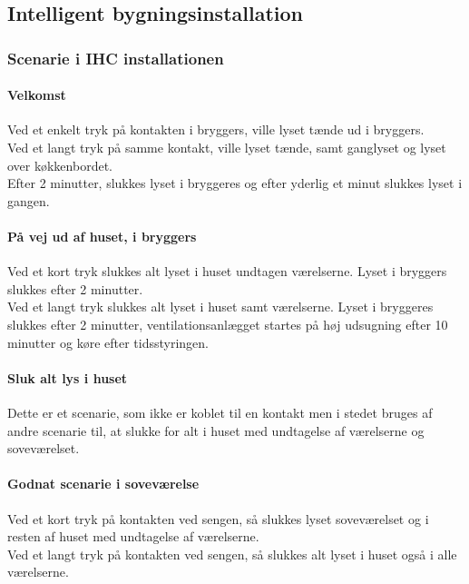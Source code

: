 \subsection{Intelligent bygningsinstallation}

\subsubsection{Scenarie i IHC installationen} \label{subsub:ihc_scener}

\paragraph{Velkomst}
Ved et enkelt tryk på kontakten i bryggers, ville lyset tænde ud i bryggers.\\
Ved et langt tryk på samme kontakt, ville lyset tænde, 
samt ganglyset og lyset over køkkenbordet.\\
Efter 2 minutter, slukkes lyset i bryggeres og efter yderlig et minut slukkes lyset i gangen.

\paragraph{På vej ud af huset, i bryggers}
Ved et kort tryk slukkes alt lyset i huset undtagen værelserne. 
Lyset i bryggers slukkes efter 2 minutter. \\
Ved et langt tryk slukkes alt lyset i huset samt værelserne. 
Lyset i bryggeres slukkes efter 2 minutter, 
ventilationsanlægget startes på høj udsugning efter 10 minutter og køre efter tidsstyringen. 

\paragraph{Sluk alt lys i huset}
Dette er et scenarie, som ikke er koblet til en kontakt men i stedet bruges af andre scenarie til, 
at slukke for alt i huset med undtagelse af værelserne og soveværelset.

\paragraph{Godnat scenarie i soveværelse}
Ved et kort tryk på kontakten ved sengen, 
så slukkes lyset soveværelset og i resten af huset med undtagelse af værelserne.\\
Ved et langt tryk på kontakten ved sengen, 
så slukkes alt lyset i huset også i alle værelserne.

